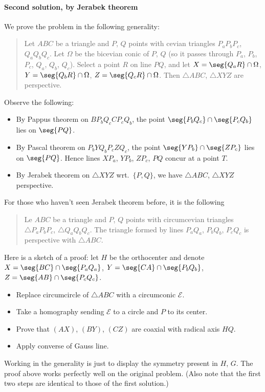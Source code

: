 \paragraph{Second solution, by Jerabek theorem} We prove the problem in the following generality:
\begin{quote}
    Let $ABC$ be a triangle and $P$, $Q$ points with cevian triangles $P_aP_bP_c$, $Q_aQ_bQ_c$. Let $\Omega$ be the bicevian conic of $P$, $Q$ (so it passes through $P_a$, $P_b$, $P_c$, $Q_a$, $Q_b$, $Q_c$). Select a point $R$ on line $PQ$, and let $X=\seg{Q_aR}\cap\Omega$, $Y=\seg{Q_bR}\cap\Omega$, $Z=\seg{Q_cR}\cap\Omega$. Then $\triangle ABC$, $\triangle XYZ$ are perspective.
\end{quote}
Observe the following:
\begin{itemize}
    \item By Pappus theorem on $BP_bQ_cCP_cQ_b$, the point $\seg{P_bQ_c}\cap\seg{P_cQ_b}$ lies on $\seg{PQ}$.
    \item By Pascal theorem on $P_bYQ_bP_cZQ_c$, the point $\seg{YP_b}\cap\seg{ZP_c}$ lies on $\seg{PQ}$. Hence lines $XP_a$, $YP_b$, $ZP_c$, $PQ$ concur at a point $T$.
    \item By Jerabek theorem on $\triangle XYZ$ wrt.\ $\{P,Q\}$, we have $\triangle ABC$, $\triangle XYZ$ perspective.
\end{itemize}
\begin{remark}
    For those who haven't seen Jerabek theorem before, it is the following
    \begin{quote}
        Le $ABC$ be a triangle and $P$, $Q$ points with circumcevian triangles $\triangle P_aP_bP_c$, $\triangle Q_aQ_bQ_c$. The triangle formed by lines $P_aQ_a$, $P_bQ_b$, $P_cQ_c$ is perspective with $\triangle ABC$.
    \end{quote}
    Here is a sketch of a proof: let $H$ be the orthocenter and denote $X=\seg{BC}\cap\seg{P_aQ_a}$, $Y=\seg{CA}\cap\seg{P_bQ_b}$, $Z=\seg{AB}\cap\seg{P_cQ_c}$.
    \begin{itemize}[itemsep=0em]
    \item Replace circumcircle of $\triangle ABC$ with a circumconic $\mathscr E$.
    \item Take a homography sending $\mathscr E$ to a circle and $P$ to its center.
    \item Prove that $(AX)$, $(BY)$, $(CZ)$ are coaxial with radical axis $HQ$.
    \item Apply converse of Gauss line.
    \end{itemize}
\end{remark}
\begin{remark}
    Working in the generality is just to display the symmetry present in $H$, $G$. The proof above works perfectly well on the original problem. (Also note that the first two steps are identical to those of the first solution.)
\end{remark}

